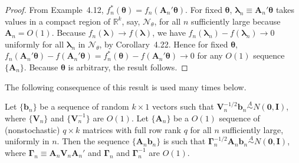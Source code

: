 \begin{proof}
From Example~4.12, $f_n^*(\boldsymbol{\theta}) = f_n(\mathbf{A}_n'\boldsymbol{\theta})$. For fixed $\boldsymbol{\theta}$, $\boldsymbol{\lambda}_n \equiv \mathbf{A}_n'\boldsymbol{\theta}$ takes
values in a compact region of $\mathbb{R}^k$, say, $\mathcal{N}_\theta$, for all $n$ sufficiently large because
$\mathbf{A}_n = O(1)$. Because $f_n(\boldsymbol{\lambda}) \to f(\boldsymbol{\lambda})$, we have $f_n(\boldsymbol{\lambda}_n) - f(\boldsymbol{\lambda}_n) \to 0$ uniformly
for all $\boldsymbol{\lambda}_n$ in $\mathcal{N}_\theta$, by Corollary~4.22. Hence for fixed $\boldsymbol{\theta}$, $f_n(\mathbf{A}_n'\boldsymbol{\theta}) - f(\mathbf{A}_n'\boldsymbol{\theta}) =
f_n^*(\boldsymbol{\theta}) - f(\mathbf{A}_n'\boldsymbol{\theta}) \to 0$ for any $O(1)$ sequence $\{\mathbf{A}_n\}$. Because $\boldsymbol{\theta}$ is arbitrary,
the result follows.
\end{proof}

The following consequence of this result is used many times below.

\begin{corollary}\label{cor:4.24}
Let $\{\mathbf{b}_n\}$ be a sequence of random $k \times 1$ vectors such that $\mathbf{V}_n^{-1/2}\mathbf{b}_n \overset{A}{\sim} N(\mathbf{0}, \mathbf{I})$, where $\{\mathbf{V}_n\}$ and $\{\mathbf{V}_n^{-1}\}$ are $O(1)$. Let $\{\mathbf{A}_n\}$ be a $O(1)$ sequence of (nonstochastic) $q \times k$ matrices with full row rank $q$ for all $n$ sufficiently large, uniformly in $n$. Then the sequence $\{\mathbf{A}_n\mathbf{b}_n\}$ is such that $\boldsymbol{\Gamma}_n^{-1/2}\mathbf{A}_n\mathbf{b}_n \overset{A}{\sim} N(\mathbf{0}, \mathbf{I})$, where $\boldsymbol{\Gamma}_n \equiv \mathbf{A}_n\mathbf{V}_n\mathbf{A}_n'$ and $\boldsymbol{\Gamma}_n$ and $\boldsymbol{\Gamma}_n^{-1}$ are $O(1)$.
\end{corollary}

